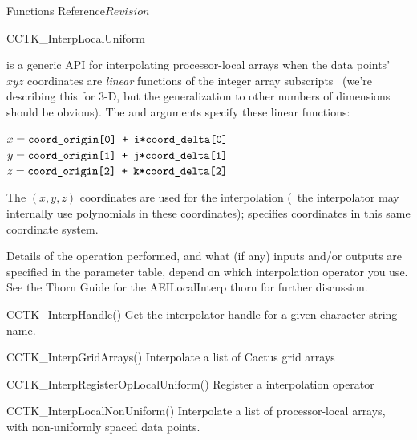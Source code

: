 \begin{cactuspart}{ Functions Reference}{}{$Revision$}
\begin{FunctionDescription}{CCTK\_InterpLocalUniform}
\begin{Discussion}
 is a generic API for interpolating
processor-local arrays when the data points'~$xyz$ coordinates are
{\em linear\/} functions of the integer array subscripts~
(we're describing this for 3-D, but the generalization to other numbers
of dimensions should be obvious).  The  and
 arguments specify these linear functions:
\begin{flushleft}
$x = \mbox{\texttt{coord\_origin[0] + i*coord\_delta[0]}}$ \\
$y = \mbox{\texttt{coord\_origin[1] + j*coord\_delta[1]}}$ \\
$z = \mbox{\texttt{coord\_origin[2] + k*coord\_delta[2]}}$ %
\end{flushleft}
The $(x,y,z)$ coordinates are used for the interpolation
(\ie{}~the interpolator may internally use polynomials in these
coordinates);  specifies coordinates in this
same coordinate system.

Details of the operation performed, and what (if any) inputs and/or
outputs are specified in the parameter table, depend on which interpolation
operator you use.  See the Thorn Guide for the AEILocalInterp thorn for
further discussion.
\end{Discussion}

\begin{SeeAlsoSection}
\begin{SeeAlso}{CCTK\_InterpHandle()}
Get the interpolator handle for a given character-string name.
\end{SeeAlso}
\begin{SeeAlso}{CCTK\_InterpGridArrays()}
Interpolate a list of Cactus grid arrays
\end{SeeAlso}
\begin{SeeAlso}{CCTK\_InterpRegisterOpLocalUniform()}
\mbox{}
Register a  interpolation operator
\end{SeeAlso}
\begin{SeeAlso}{CCTK\_InterpLocalNonUniform()}
Interpolate a list of processor-local arrays,
with non-uniformly spaced data points.
\end{SeeAlso}
\end{SeeAlsoSection}


\end{FunctionDescription}
\end{cactuspart}
